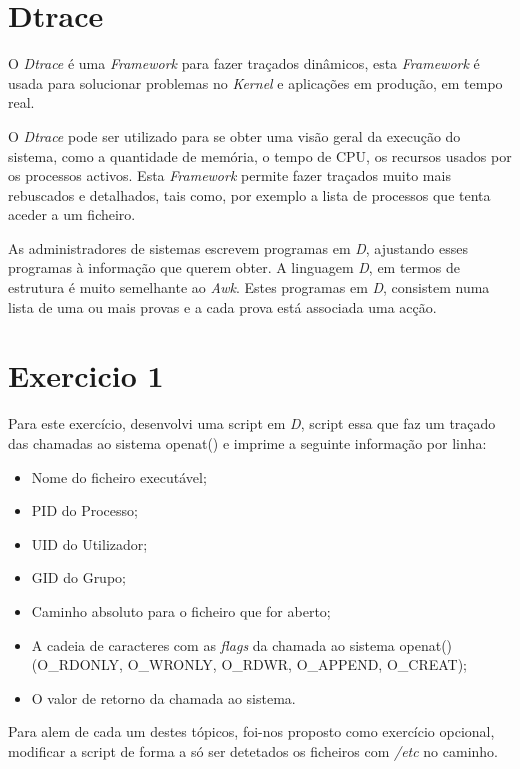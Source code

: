 \documentclass[conference,compsoc]{IEEEtran}
\begin{document}
\section{Dtrace}
O \textit{Dtrace} é uma \textit{Framework} para fazer traçados dinâmicos, esta \textit{Framework} é usada para solucionar problemas no \textit{Kernel} e aplicações em produção, em tempo real.

O \textit{Dtrace} pode ser utilizado para se obter uma visão geral da execução do sistema, como a quantidade de memória, o tempo de CPU, os recursos usados por os processos activos. Esta \textit{Framework} permite fazer traçados muito mais rebuscados e detalhados, tais como, por exemplo a lista de processos que tenta aceder a um ficheiro.

As administradores de sistemas escrevem programas em \textit{D}, ajustando esses programas à informação que querem obter. A linguagem \textit{D}, em termos de estrutura é muito semelhante ao \textit{Awk}. Estes programas em \textit{D}, consistem numa lista de uma ou mais provas e a cada prova está associada uma acção.

\section{Exercicio 1}
Para este exercício, desenvolvi uma script em \textit{D}, script essa que faz um traçado das chamadas ao sistema openat() e imprime a seguinte informação por linha:
\begin{itemize}
\item Nome do ficheiro executável;
\item PID do Processo;
\item UID do Utilizador;
\item GID do Grupo;
\item Caminho absoluto para o ficheiro que for aberto;
\item A cadeia de caracteres com as \textit{flags} da chamada ao sistema openat() (O\_RDONLY, O\_WRONLY, O\_RDWR, O\_APPEND, O\_CREAT);
\item O valor de retorno da chamada ao sistema.
\end{itemize}

Para alem de cada um destes tópicos, foi-nos proposto como exercício opcional, modificar a script de forma a só ser detetados os ficheiros com \textit{/etc} no caminho. 
\end{document}
